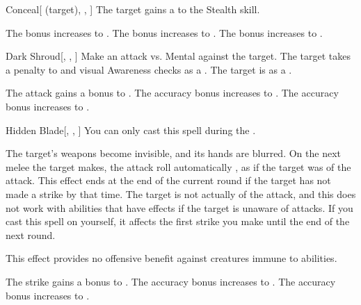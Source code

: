 \lowercase{\hypertarget{spell:Conceal}{}}\label{spell:Conceal}
\begin{attuneability}[Rank 1]{\hypertarget{spell:Conceal}{Conceal}}[ (target), , ]
The target gains a   to the Stealth skill.

\rankline
{} The bonus increases to .
 The bonus increases to .
 The bonus increases to .
\end{attuneability}
\vspace{0.25em}



\lowercase{\hypertarget{spell:Dark Shroud}{}}\label{spell:Dark Shroud}
\begin{freeability}[Rank 1]{\hypertarget{spell:Dark Shroud}{Dark Shroud}}[, , ]
Make an attack vs. Mental against the target.
\hit The target takes a  penalty to  and visual Awareness checks as a .
\crit The target is  as a .

\rankline
{} The attack gains a  bonus to .
 The accuracy bonus increases to .
 The accuracy bonus increases to .
\end{freeability}
\vspace{0.25em}



\lowercase{\hypertarget{spell:Hidden Blade}{}}\label{spell:Hidden Blade}
\begin{freeability}[Rank 1]{\hypertarget{spell:Hidden Blade}{Hidden Blade}}[, , ]
You can only cast this spell during the .

The target's weapons become invisible, and its hands are blurred.
On the next melee  the target makes,
the attack roll automatically ,
as if the target was  of the attack.
This effect ends at the end of the current round if the target has not made a strike by that time.
The target is not actually  of the attack, and this does not work with abilities that have effects if the target is unaware of attacks.
If you cast this spell on yourself, it affects the first strike you make until the end of the next round.

This effect provides no offensive benefit against creatures immune to  abilities.

\rankline
{} The strike gains a  bonus to .
 The accuracy bonus increases to .
 The accuracy bonus increases to .
\end{freeability}
\vspace{0.25em}




